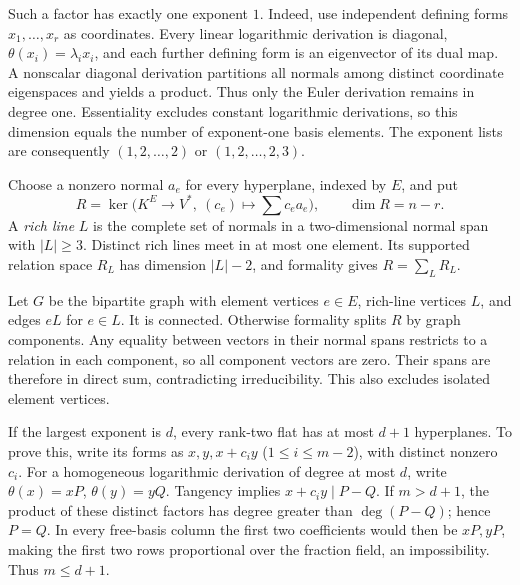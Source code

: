 \documentclass[11pt]{article}
\begin{document}
Such a factor has exactly one exponent $1$. Indeed, use independent defining forms $x_1,\ldots,x_r$ as coordinates. Every linear logarithmic derivation is diagonal, $\theta(x_i)=\lambda_i x_i$, and each further defining form is an eigenvector of its dual map. A nonscalar diagonal derivation partitions all normals among distinct coordinate eigenspaces and yields a product. Thus only the Euler derivation remains in degree one. Essentiality excludes constant logarithmic derivations, so this dimension equals the number of exponent-one basis elements. The exponent lists are consequently $(1,2,\ldots,2)$ or $(1,2,\ldots,2,3)$.

Choose a nonzero normal $a_e$ for every hyperplane, indexed by $E$, and put
\[
R=\ker\bigl(K^E\longrightarrow V^*,\ (c_e)\longmapsto\sum c_ea_e\bigr),
\qquad \dim R=n-r.
\]
A \emph{rich line} $L$ is the complete set of normals in a two-dimensional normal span with $|L|\geq3$. Distinct rich lines meet in at most one element. Its supported relation space $R_L$ has dimension $|L|-2$, and formality gives $R=\sum_L R_L$.

Let $G$ be the bipartite graph with element vertices $e\in E$, rich-line vertices $L$, and edges $eL$ for $e\in L$. It is connected. Otherwise formality splits $R$ by graph components. Any equality between vectors in their normal spans restricts to a relation in each component, so all component vectors are zero. Their spans are therefore in direct sum, contradicting irreducibility. This also excludes isolated element vertices.

If the largest exponent is $d$, every rank-two flat has at most $d+1$ hyperplanes. To prove this, write its forms as $x,y,x+c_i y$ ($1\leq i\leq m-2$), with distinct nonzero $c_i$. For a homogeneous logarithmic derivation of degree at most $d$, write $\theta(x)=xP$, $\theta(y)=yQ$. Tangency implies $x+c_i y\mid P-Q$. If $m>d+1$, the product of these distinct factors has degree greater than $\deg(P-Q)$; hence $P=Q$. In every free-basis column the first two coefficients would then be $xP,yP$, making the first two rows proportional over the fraction field, an impossibility. Thus $m\leq d+1$.
\end{document}
